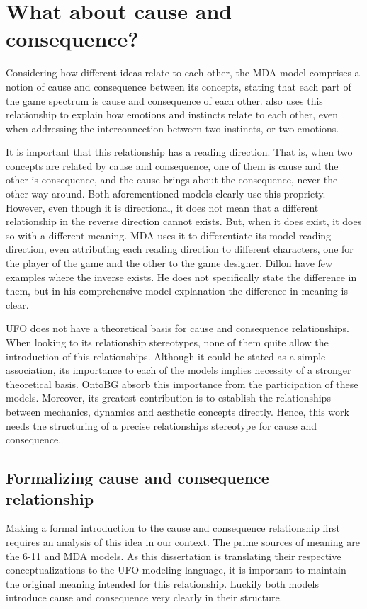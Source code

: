 \section{What about cause and consequence?}

Considering how different ideas relate to each other, the MDA model comprises a notion of cause and consequence between its concepts, stating that each part of the game spectrum is cause and consequence of each other. \citet{dillon_way_2010} also uses this relationship to explain how emotions and instincts relate to each other, even when addressing the interconnection between two instincts, or two emotions.

It is important that this relationship has a reading direction. That is, when two concepts are related by cause and consequence, one of them is cause and the other is consequence, and the cause brings about the consequence, never the other way around. Both aforementioned models clearly use this propriety. 
However, even though it is directional, it does not mean that a different relationship in the reverse direction cannot exists. But, when it does exist, it does so with a different meaning. MDA uses it to differentiate its model reading direction, even attributing each reading direction to different characters, one for the player of the game and the other to the game designer. Dillon have few examples where the inverse exists. He does not specifically state the difference in them, but in his comprehensive model explanation the difference in meaning is clear.

UFO does not have a theoretical basis for cause and consequence relationships. When looking to its relationship stereotypes, none of them quite allow the introduction of this relationships. Although it could be stated as a simple association, its importance to each of the models implies necessity of a stronger theoretical basis. OntoBG absorb this importance from the participation of these models. Moreover, its greatest contribution is to establish the relationships between mechanics, dynamics and aesthetic concepts directly. Hence, this work needs the structuring of a precise relationships stereotype for cause and consequence.

\subsection{Formalizing cause and consequence relationship}


Making a formal introduction to the cause and consequence relationship first requires  an analysis of this idea in our context. The prime sources of meaning are the 6-11 and MDA models. As this dissertation is translating their respective conceptualizations to the UFO modeling language, it is important to maintain the original meaning intended for this relationship. Luckily both models introduce cause and consequence very clearly in their structure. 

